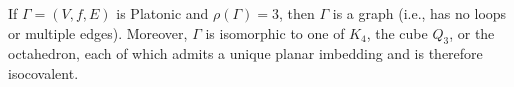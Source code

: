 If $\Gamma = (V, f, E)$ is Platonic and $\rho(\Gamma) = 3$, then $\Gamma$ is a graph (i.e., has no loops or multiple edges). Moreover, $\Gamma$ is isomorphic to one of $K_4$, the cube $Q_3$, or the octahedron, each of which admits a unique planar imbedding and is therefore isocovalent.
